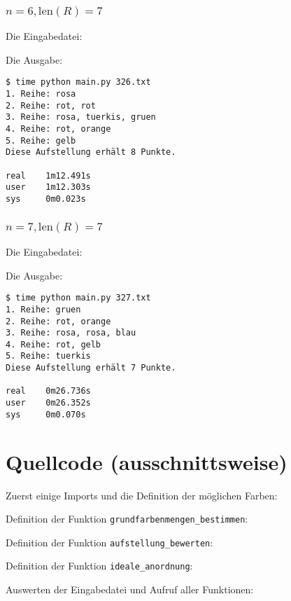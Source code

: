 \documentclass[a4paper,10pt,ngerman]{scrartcl}
\begin{document}
\subsubsection{$n=6, \textrm{len}(R)=7$}
\label{sec:67}
Die Eingabedatei:


Die Ausgabe:
\begin{lstlisting}
$ time python main.py 326.txt 
1. Reihe: rosa
2. Reihe: rot, rot
3. Reihe: rosa, tuerkis, gruen
4. Reihe: rot, orange
5. Reihe: gelb
Diese Aufstellung erhält 8 Punkte.

real    1m12.491s
user    1m12.303s
sys     0m0.023s
\end{lstlisting}

\subsubsection{$n=7, \textrm{len}(R)=7$}
\label{sec:77}
Die Eingabedatei:


Die Ausgabe:
\begin{lstlisting}
$ time python main.py 327.txt 
1. Reihe: gruen
2. Reihe: rot, orange
3. Reihe: rosa, rosa, blau
4. Reihe: rot, gelb
5. Reihe: tuerkis
Diese Aufstellung erhält 7 Punkte.

real    0m26.736s
user    0m26.352s
sys     0m0.070s
\end{lstlisting}

\section{Quellcode (ausschnittsweise)}
Zuerst einige Imports und die Definition der möglichen Farben:


Definition der Funktion \texttt{grundfarbenmengen\_bestimmen}:


Definition der Funktion \texttt{aufstellung\_bewerten}:


Definition der Funktion \texttt{ideale\_anordnung}:


Auswerten der Eingabedatei und Aufruf aller Funktionen:

\end{document}
